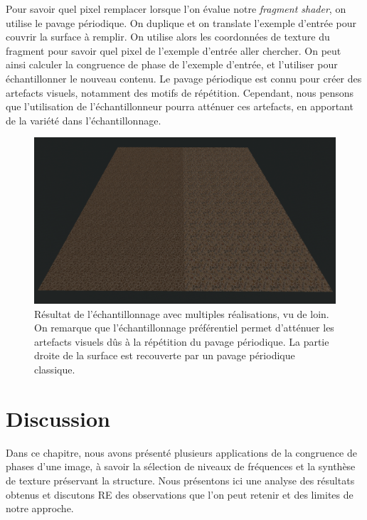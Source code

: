 Pour savoir quel pixel remplacer lorsque l'on évalue notre \textit{fragment shader}, on utilise le pavage périodique. On duplique et on translate l'exemple d'entrée pour couvrir la surface à remplir. On utilise alors les coordonnées de texture du fragment pour savoir quel pixel de l'exemple d'entrée aller chercher. On peut ainsi calculer la congruence de phase de l'exemple d'entrée, et l'utiliser pour échantillonner le nouveau contenu. Le pavage périodique est connu pour créer des artefacts visuels, notamment des motifs de répétition. Cependant, nous pensons que l'utilisation de l'échantillonneur pourra atténuer ces artefacts, en apportant de la variété dans l'échantillonnage.

\begin{figure}[t]
    \centering
    \includegraphics[width=\textwidth]{contenu/resources/images/partitioned_sampling_pc_preserving_shuffle_uv_far}
    \caption{Résultat de l'échantillonnage avec multiples réalisations, vu de loin. On remarque que l'échantillonnage préférentiel permet d'atténuer les artefacts visuels dûs à la répétition du pavage périodique. La partie droite de la surface est recouverte par un pavage périodique classique.}
    \label{fig:pc-preserving-synthesis}
\end{figure}


\section{Discussion}

Dans ce chapitre, nous avons présenté plusieurs applications de la congruence de phases d'une image, à savoir la sélection de niveaux de fréquences et la synthèse de texture préservant la structure. Nous présentons ici une analyse des résultats obtenus et discutons RE des observations que l'on peut retenir et des limites de notre approche.

